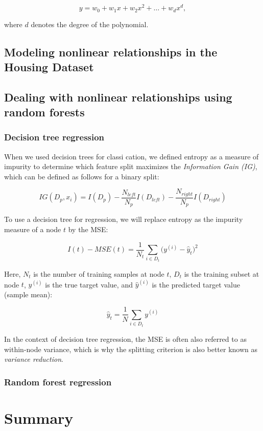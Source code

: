 \documentclass[letterpaper]{report}
\begin{document}
\[
y = w_0 + w_1 x + w_2 x^2 + \dots + w_d x^d,
\]

where $d$ denotes the degree of the polynomial.

\subsection{Modeling nonlinear relationships in the Housing Dataset}
\subsection{Dealing with nonlinear relationships using random forests}
\subsubsection{Decision tree regression}

When we used decision trees for classi cation, we defined entropy as a measure of impurity to determine which feature split maximizes the \textit{Information Gain (IG)}, which can be defined as follows for a binary split:

\[
IG(D_p, x_i) = I(D_p) - \frac{N_{left}}{N_{p}} I (D_{left}) - \frac{N_{right}}{N_p} I (D_{right})
\]

To use a decision tree for regression, we will replace entropy as the impurity measure of a node $t$ by the MSE:

\[
I(t) - MSE(t) = \frac{1}{N_t} \sum_{i \in D_t} \big( y^{(i)} - \hat{y}_t  \big)^2
\]

Here, $N_t$ is the number of training samples at node $t$, $D_t$ is the training subset at node $t$, $y^{(i)}$ is the true target value, and $\hat{y}^{(i)}$ is the predicted target value (sample mean):

\[
\hat{y}_t = \frac{1}{N} \sum_{i \in D_t} y^{(i)}
\]

In the context of decision tree regression, the MSE is often also referred to as within-node variance, which is why the splitting criterion is also better known
as \textit{variance reduction}. 

\subsubsection{Random forest regression}
\section{Summary}
\end{document}
